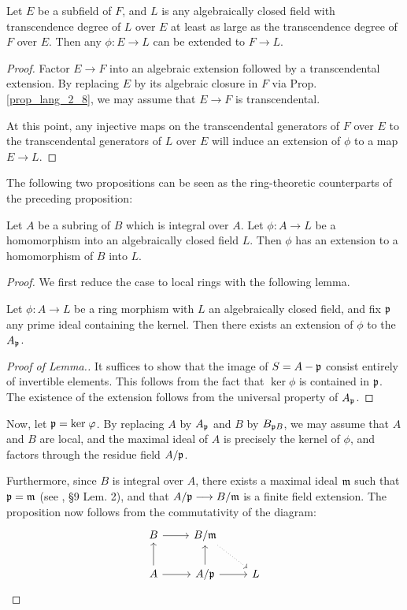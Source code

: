 \begin{prop}
Let $E$ be a subfield of $F$, and $L$ is any algebraically closed
field with transcendence degree of $L$ over $E$ at least as large 
as the transcendence degree of $F$ over $E$. Then any $\phi: E \to 
L$ can be extended to $F \to L$.
\end{prop}
\begin{proof}
Factor $E \to F$ into an algebraic extension followed by a 
transcendental extension. By replacing $E$ by its algebraic 
closure in $F$ via Prop. \ref{prop_lang_2_8}, we may assume that 
$E \to F$ is transcendental.

At this point, any injective maps on the transcendental generators 
of $F$ over $E$ to the transcendental generators of $L$ over $E$
will induce an extension of $\phi$ to a map $E \to L$.
\end{proof}

The following two propositions can be seen as the ring-theoretic
counterparts of the preceding proposition:

\begin{prop}\label{prop_lang_3_1}
Let $A$ be a subring of $B$ which is integral over $A$. Let
$\phi: A \to L$ be a homomorphism into an algebraically closed 
field $L$. Then $\phi$ has an extension to a homomorphism of $B$
into $L$.
\end{prop}

\begin{proof}
We first reduce the case to local rings with the following lemma.

\begin{lem}\label{lem_lang_3_1}
Let $\phi : A \to L$ be a ring morphism with $L$ an algebraically
closed field, and fix $\mathfrak{p}$ any prime ideal containing the
kernel. Then there exists an extension of $\phi$ to the 
$A_{\mathfrak{p}}$.
\end{lem}
\begin{proof}[Proof of Lemma.]
It suffices to show that the image of $S = A - \mathfrak{p}$ consist
entirely of invertible elements. This follows from the fact that
$\ker \phi$ is contained in $\mathfrak{p}$. The existence of the
extension follows from the universal property of $A_{\mathfrak{p}}$.
\end{proof}

Now, let $\mathfrak{p} = \mathrm{ker}\; \varphi$. By replacing $A$ by $A_{\mathfrak{p}}$
and $B$ by $B_{\mathfrak{p}B}$, we may assume that $A$ and $B$ are
local, and the maximal ideal of $A$ is precisely the kernel of $\phi$,
and factors through the residue field $A/\mathfrak{p}$.

Furthermore, since $B$ is integral over $A$, there exists a maximal
ideal $\mathfrak{m}$ such that $\mathfrak{p} = \mathfrak{m}$ (see 
\cite{MatsCA}, \S9 Lem. 2), and that $A/\mathfrak{p} \longrightarrow B/\mathfrak{m}$ is
a finite field extension. The proposition now follows from the
commutativity of the diagram:
\[
\begin{tikzcd}
B \arrow{r}
& B/\ideal{m} \arrow[dotted]{rd} \\
A \arrow{r}\arrow{u}
& A/\ideal{p} \arrow{r}\arrow{u}
& L
\end{tikzcd}
\]
\end{proof}

